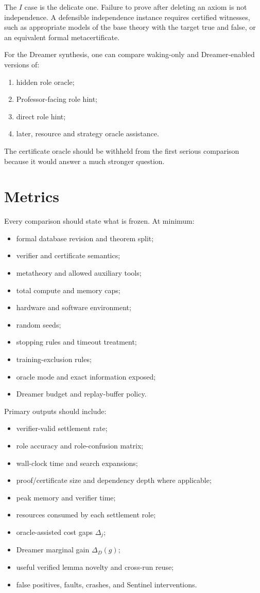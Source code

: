 \documentclass[11pt]{article}
\begin{document}
The $I$ case is the delicate one. Failure to prove after deleting an axiom is not independence. A defensible independence instance requires certified witnesses, such as appropriate models of the base theory with the target true and false, or an equivalent formal metacertificate.

For the Dreamer synthesis, one can compare waking-only and Dreamer-enabled versions of:
\begin{enumerate}[leftmargin=2em]
\item hidden role oracle;
\item Professor-facing role hint;
\item direct role hint;
\item later, resource and strategy oracle assistance.
\end{enumerate}

The certificate oracle should be withheld from the first serious comparison because it would answer a much stronger question.

\section{Metrics}

Every comparison should state what is frozen. At minimum:
\begin{itemize}
\item formal database revision and theorem split;
\item verifier and certificate semantics;
\item metatheory and allowed auxiliary tools;
\item total compute and memory caps;
\item hardware and software environment;
\item random seeds;
\item stopping rules and timeout treatment;
\item training-exclusion rules;
\item oracle mode and exact information exposed;
\item Dreamer budget and replay-buffer policy.
\end{itemize}

Primary outputs should include:
\begin{itemize}
\item verifier-valid settlement rate;
\item role accuracy and role-confusion matrix;
\item wall-clock time and search expansions;
\item proof/certificate size and dependency depth where applicable;
\item peak memory and verifier time;
\item resources consumed by each settlement role;
\item oracle-assisted cost gaps $\Delta_j$;
\item Dreamer marginal gain $\Delta_D(g)$;
\item useful verified lemma novelty and cross-run reuse;
\item false positives, faults, crashes, and Sentinel interventions.
\end{itemize}
\end{document}
